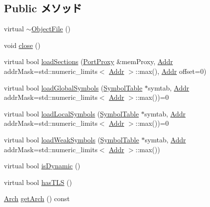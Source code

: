 \subsection*{Public メソッド}
\begin{DoxyCompactItemize}
\item 
virtual \hyperlink{classObjectFile_a30c48e661f5edc3172278593aea73067}{$\sim$ObjectFile} ()
\item 
void \hyperlink{classObjectFile_a5ae591df94fc66ccb85cbb6565368bca}{close} ()
\item 
virtual bool \hyperlink{classObjectFile_a69ba3469bb66a1ffa5049d581c1faf70}{loadSections} (\hyperlink{classPortProxy}{PortProxy} \&memProxy, \hyperlink{base_2types_8hh_af1bb03d6a4ee096394a6749f0a169232}{Addr} addrMask=std::numeric\_\-limits$<$ \hyperlink{base_2types_8hh_af1bb03d6a4ee096394a6749f0a169232}{Addr} $>$::max(), \hyperlink{base_2types_8hh_af1bb03d6a4ee096394a6749f0a169232}{Addr} offset=0)
\item 
virtual bool \hyperlink{classObjectFile_abd8b86c98494f055ba7e0babbd55f4a0}{loadGlobalSymbols} (\hyperlink{classSymbolTable}{SymbolTable} $\ast$symtab, \hyperlink{base_2types_8hh_af1bb03d6a4ee096394a6749f0a169232}{Addr} addrMask=std::numeric\_\-limits$<$ \hyperlink{base_2types_8hh_af1bb03d6a4ee096394a6749f0a169232}{Addr} $>$::max())=0
\item 
virtual bool \hyperlink{classObjectFile_a15e7fbacc339ac9a4d50e4aa36591339}{loadLocalSymbols} (\hyperlink{classSymbolTable}{SymbolTable} $\ast$symtab, \hyperlink{base_2types_8hh_af1bb03d6a4ee096394a6749f0a169232}{Addr} addrMask=std::numeric\_\-limits$<$ \hyperlink{base_2types_8hh_af1bb03d6a4ee096394a6749f0a169232}{Addr} $>$::max())=0
\item 
virtual bool \hyperlink{classObjectFile_ad466ccc8c0bb76d0ff5a2e7e965a2200}{loadWeakSymbols} (\hyperlink{classSymbolTable}{SymbolTable} $\ast$symtab, \hyperlink{base_2types_8hh_af1bb03d6a4ee096394a6749f0a169232}{Addr} addrMask=std::numeric\_\-limits$<$ \hyperlink{base_2types_8hh_af1bb03d6a4ee096394a6749f0a169232}{Addr} $>$::max())
\item 
virtual bool \hyperlink{classObjectFile_adeb3f3d68421f3e5f75dbbdf998a21ac}{isDynamic} ()
\item 
virtual bool \hyperlink{classObjectFile_a1ed34e505be8c6dabe578012e35a0317}{hasTLS} ()
\item 
\hyperlink{classObjectFile_a0ac03ab06a859320a9072002bdf3aa0f}{Arch} \hyperlink{classObjectFile_ad7fc69cf1a5c5cab25428f0c85c869bf}{getArch} () const 
\item 

\end{DoxyCompactItemize}
